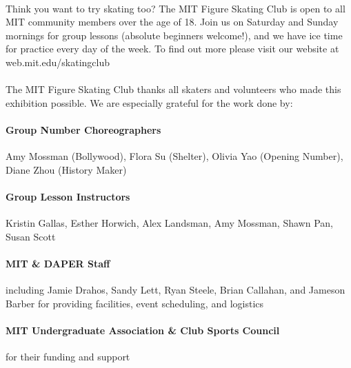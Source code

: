\documentclass[12pt]{article}
\begin{document}
\begin{multicols*}{2}






\paragraph{} Think you want to try skating too? The MIT Figure Skating Club is open to all MIT community members over the age of 18. Join us on Saturday and Sunday mornings for group lessons (absolute beginners welcome!), and we have ice time for practice every day of the week. To find out more please visit our website at web.mit.edu/skatingclub



\paragraph{} The MIT Figure Skating Club thanks all skaters and volunteers who made this exhibition possible. We are especially grateful for the work done by:



\paragraph{Group Number Choreographers} Amy Mossman (Bollywood), Flora Su (Shelter), Olivia Yao (Opening Number), Diane Zhou (History Maker)

\paragraph{Group Lesson Instructors} Kristin Gallas, Esther Horwich, Alex Landsman, Amy Mossman, Shawn Pan, Susan Scott

\paragraph{MIT \& DAPER Staff} including Jamie Drahos, Sandy Lett, Ryan Steele, Brian Callahan, and Jameson Barber for providing facilities, event scheduling, and logistics

\paragraph{MIT Undergraduate Association \& Club Sports Council} for their funding and support




\end{multicols*}
\end{document}
